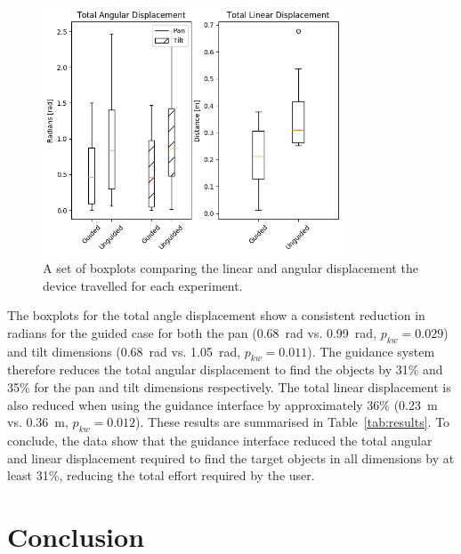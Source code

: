 \documentclass[runningheads]{llncs}
\begin{document}
\begin{figure}
  \centering
  \includegraphics[width=0.8\textwidth]{figures/boxplot_displacement.png}
  \caption{A set of boxplots comparing the linear and angular displacement the device travelled for each experiment. }\label{fig:boxplot-displacement}
\end{figure}

The boxplots for the total angle displacement show a consistent reduction in radians for the guided case for both the pan (\SI{0.68}{\radian} vs. \SI{0.99}{\radian}, $p_{kw}=0.029$) and tilt dimensions (\SI{0.68}{\radian} vs. \SI{1.05}{\radian}, $p_{kw}=0.011$). 
The guidance system therefore reduces the total angular displacement to find the objects by 31\% and 35\% for the pan and tilt dimensions respectively. 
The total linear displacement is also reduced when using the guidance interface by approximately 36\% (\SI{0.23}{\metre} vs. \SI{0.36}{\metre}, $p_{kw}=0.012$).
These results are summarised in Table~\ref{tab:results}.
To conclude, the data show that the guidance interface reduced the total angular and linear displacement required to find the target objects in all dimensions by at least 31\%, reducing the total effort required by the user. 

\section{Conclusion}\label{sec:conclusion}
\end{document}
